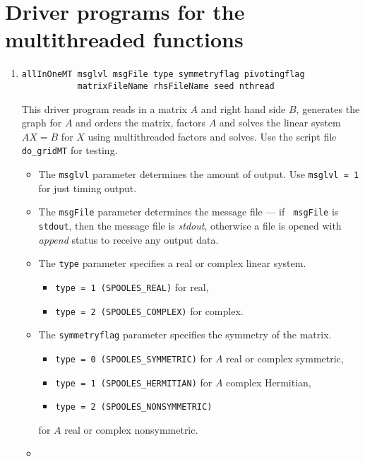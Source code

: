 \par
\section{Driver programs for the multithreaded functions}
\label{section:MT:drivers}
\par
\begin{enumerate}
\item
\begin{verbatim}
allInOneMT msglvl msgFile type symmetryflag pivotingflag 
           matrixFileName rhsFileName seed nthread
\end{verbatim}
This driver program reads in a matrix $A$ and right hand side $B$,
generates the graph for $A$ and orders the matrix,
factors $A$ and solves the linear system $AX = B$ for $X$
using multithreaded factors and solves.
Use the script file {\tt do\_gridMT} for testing.
\par
\begin{itemize}
\item
The {\tt msglvl} parameter determines the amount of output.
Use {\tt msglvl = 1} for just timing output.
\item
The {\tt msgFile} parameter determines the message file --- if {\tt
msgFile} is {\tt stdout}, then the message file is {\it stdout},
otherwise a file is opened with {\it append} status to receive any
output data.
\item
The {\tt type} parameter specifies a real or complex linear system.
\begin{itemize}
\item
{\tt type = 1 (SPOOLES\_REAL)} for real,
\item
{\tt type = 2 (SPOOLES\_COMPLEX)} for complex.
\end{itemize}
\item
The {\tt symmetryflag} parameter specifies the symmetry of the matrix.
\begin{itemize}
\item
{\tt type = 0 (SPOOLES\_SYMMETRIC)} for $A$ real or complex symmetric,
\item
{\tt type = 1 (SPOOLES\_HERMITIAN)} for $A$ complex Hermitian,
\item
{\tt type = 2 (SPOOLES\_NONSYMMETRIC)}
\end{itemize}
for $A$ real or complex nonsymmetric.
\item

\end{itemize}
\end{enumerate}
